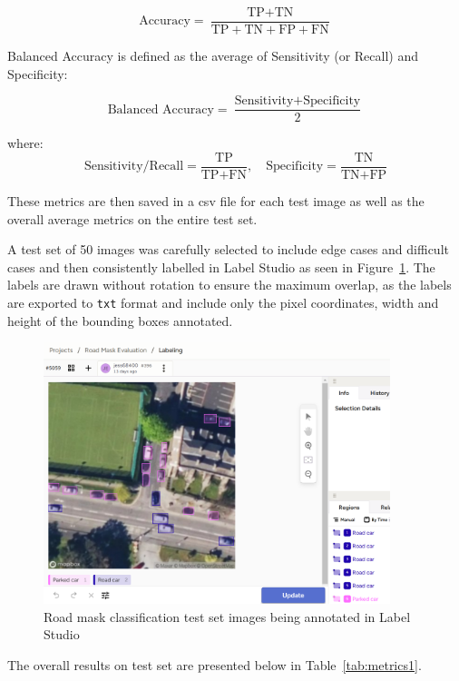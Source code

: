 \[
\text{Accuracy} = \frac{\text{TP} + \text{TN}}{\text{TP} + \text{TN} + \text{FP} + \text{FN}}
\]

Balanced Accuracy is defined as the average of Sensitivity (or Recall) and Specificity:

\[
\text{Balanced Accuracy} = \frac{\text{Sensitivity} + \text{Specificity}}{2}
\]

where:
\[
\text{Sensitivity/Recall} = \frac{\text{TP}}{\text{TP} + \text{FN}}, \quad
\text{Specificity} = \frac{\text{TN}}{\text{TN} + \text{FP}}
\]

These metrics are then saved in a csv file for each test image as well as the overall average metrics on the entire test set.

A test set of 50 images was carefully selected to include edge cases and difficult cases and then consistently labelled in Label Studio as seen in Figure~\ref{fig:LabelStudio_test_set}. The labels are drawn without rotation to ensure the maximum overlap, as the labels are exported to \texttt{txt} format and include only the pixel coordinates, width and  height of the bounding boxes annotated.

\begin{figure}[htbp]
    \centering
    \includegraphics[width=0.9\textwidth]{images/label_studio4.png}
    \caption{Road mask classification test set images being annotated in Label Studio}
    \label{fig:LabelStudio_test_set}
\end{figure}

\newpage{}


The overall results on test set are presented below in Table~\ref{tab:metrics1}.

